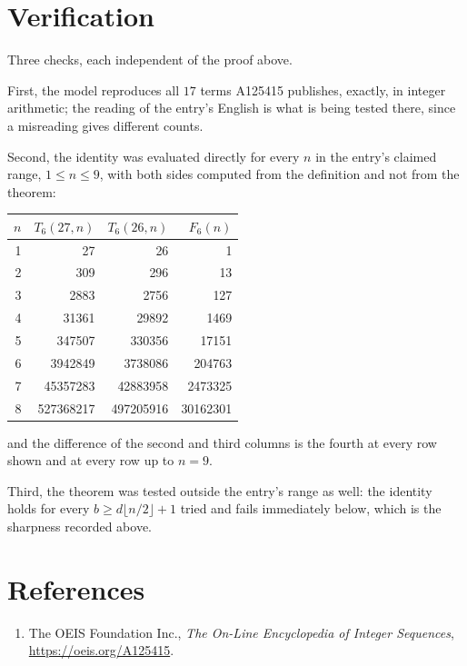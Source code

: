 \documentclass[11pt,a4paper]{article}
\theoremstyle{plain}
\theoremstyle{definition}
\begin{document}
\section{Verification}

Three checks, each independent of the proof above.

First, the model reproduces all $17$ terms A125415 publishes, exactly, in integer
arithmetic; the reading of the entry's English is what is being tested there, since a
misreading gives different counts.

Second, the identity was evaluated directly for every $n$ in the entry's claimed range,
$1\le n\le9$, with both sides computed from the definition and not from the theorem:

\begin{center}
\begin{tabular}{rrrr}
$n$ & $T_{6}(27,n)$ & $T_{6}(26,n)$ & $F_{6}(n)$ \\ \hline
1 & 27 & 26 & 1 \\
2 & 309 & 296 & 13 \\
3 & 2883 & 2756 & 127 \\
4 & 31361 & 29892 & 1469 \\
5 & 347507 & 330356 & 17151 \\
6 & 3942849 & 3738086 & 204763 \\
7 & 45357283 & 42883958 & 2473325 \\
8 & 527368217 & 497205916 & 30162301 \\
\end{tabular}
\end{center}

\noindent and the difference of the second and third columns is the fourth at every row shown
and at every row up to $n=9$.

Third, the theorem was tested outside the entry's range as well: the identity holds for every
$b\ge d\lfloor n/2\rfloor+1$ tried and fails immediately below, which is the sharpness recorded
above.

\section*{References}
\begin{enumerate}
\item The OEIS Foundation Inc., \emph{The On-Line Encyclopedia of Integer Sequences},
\url{https://oeis.org/A125415}.
\end{enumerate}
\end{document}
